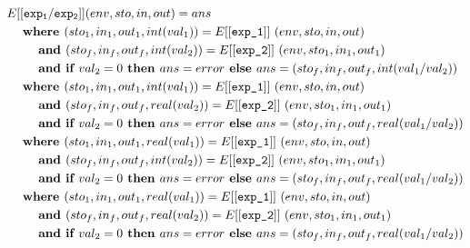 \documentclass[12pt]{article}
\newcommand\eb[1]{[[\texttt{#1}]]}
\begin{document}
\begin{align*}
&E[[{\tt exp_1 / exp_2}]] (env,sto,in,out) = ans \\
&\hspace{3ex}\textbf{where } (sto_1,in_1,out_1,int(val_1)) = E\eb{exp\_1}\ (env,sto,in,out) \\
&\hspace{6ex}\textbf{and } (sto_f,in_f,out_f,int(val_2)) = E\eb{exp\_2}\ (env,sto_1,in_1,out_1) \\
&\hspace{6ex}\textbf{and } \textbf{if } val_2 = 0 \textbf{ then } ans = error \textbf{ else } ans = (sto_f, in_f, out_f, int(val_1 / val_2)) \\
&\hspace{3ex}\textbf{where } (sto_1,in_1,out_1,int(val_1)) = E\eb{exp\_1}\ (env,sto,in,out) \\
&\hspace{6ex}\textbf{and } (sto_f,in_f,out_f,real(val_2)) = E\eb{exp\_2}\ (env,sto_1,in_1,out_1) \\
&\hspace{6ex}\textbf{and } \textbf{if } val_2 = 0 \textbf{ then } ans = error \textbf{ else } ans = (sto_f, in_f, out_f, real(val_1 / val_2)) \\
&\hspace{3ex}\textbf{where } (sto_1,in_1,out_1,real(val_1)) = E\eb{exp\_1}\ (env,sto,in,out) \\
&\hspace{6ex}\textbf{and } (sto_f,in_f,out_f,int(val_2)) = E\eb{exp\_2}\ (env,sto_1,in_1,out_1) \\
&\hspace{6ex}\textbf{and } \textbf{if } val_2 = 0 \textbf{ then } ans = error \textbf{ else } ans = (sto_f, in_f, out_f, real(val_1 / val_2)) \\
&\hspace{3ex}\textbf{where } (sto_1,in_1,out_1,real(val_1)) = E\eb{exp\_1}\ (env,sto,in,out) \\
&\hspace{6ex}\textbf{and } (sto_f,in_f,out_f,real(val_2)) = E\eb{exp\_2}\ (env,sto_1,in_1,out_1) \\
&\hspace{6ex}\textbf{and } \textbf{if } val_2 = 0 \textbf{ then } ans = error \textbf{ else } ans = (sto_f, in_f, out_f, real(val_1 / val_2)) \\
\end{align*}
\end{document}
